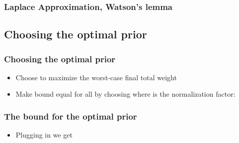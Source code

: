 \documentclass{beamer}
\begin{document}
\begin{frame}
\frametitle{Laplace Approximation, Watson's lemma}

\end{frame}

\subsection{Choosing the optimal prior}

\begin{frame}
\frametitle{Choosing the optimal prior}
\begin{itemize}
\item
Choose \R{$\dweight{\theta}{}$} to maximize the worst-case final total weight
\R{\[
\min_{\btheta} \dweight{\btheta}{} \sqrt{-2 \pi \over 
T \left. {d^2 \over d\theta^2} \right|_{\theta=\btheta} 
(g(\btheta,\theta)-g(\btheta,\btheta))}
\]}
\item
Make bound equal for all \R{$\btheta \in [0,1]$} by choosing
\R{\[
\dweight{\btheta}{*} =
{1 \over Z}
\sqrt{\left. {d^2 \over d\theta^2} \right|_{\theta=\btheta} 
(g(\btheta,\theta)-g(\btheta,\btheta)) \over - 2 \pi}~,
\]}
where  is the normalization factor:
\R{\[
Z =\sqrt{1 \over 2 \pi}\;\;
\int_0^1 \;\;\sqrt{\left. {d^2 \over d\theta^2} \right|_{\theta=\btheta} 
(g(\btheta,\btheta)-g(\btheta,\theta))} \;\;d\btheta
\]}
\end{itemize}
\end{frame}


\begin{frame}
\frametitle{The bound for the optimal prior}
\begin{itemize}
\item Plugging in we get
\end{itemize}
\end{frame}
\end{document}
